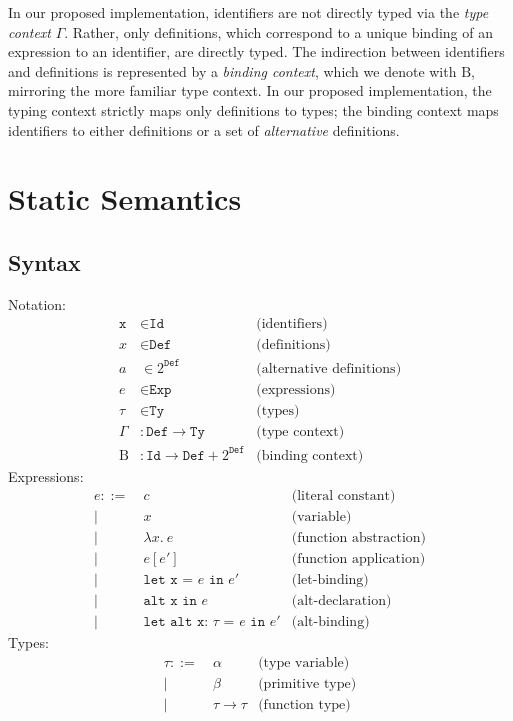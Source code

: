 \documentclass{article}
\renewcommand{\=}{\triangleq}
\begin{document}
In our proposed implementation, identifiers are not directly typed
via the \emph{type context} $\Gamma$.
Rather, only definitions, which correspond to a unique binding of an expression
to an identifier, are directly typed.
The indirection between identifiers and definitions is represented by a
\emph{binding context}, which we denote with $\text{B}$,
mirroring the more familiar type context.
In our proposed implementation, the typing context strictly maps only
definitions to types;
the binding context maps identifiers to either definitions or
a set of \emph{alternative} definitions.

\section{Static Semantics}

\subsection{Syntax}

Notation:
\begin{align*}
  \texttt{x} &\in \texttt{Id} & \text{(identifiers)} \\
  x &\in \texttt{Def} & \text{(definitions)} \\
  a &\in 2^{\texttt{Def}} & \text{(alternative definitions)} \\
  e &\in \texttt{Exp} & \text{(expressions)} \\
  \tau &\in \texttt{Ty} & \text{(types)} \\
  \Gamma &: \texttt{Def} \to \texttt{Ty} & \text{(type context)} \\
  \text{B} &: \texttt{Id} \to \texttt{Def} + 2^{\texttt{Def}} & \text{(binding context)}
\end{align*}
Expressions:
\begin{align*}
  e ::=
   ~& c & \text{(literal constant)} \\
  |~& x & \text{(variable)} \\
  |~& \lambda x .~e & \text{(function abstraction)} \\
  |~& e[e'] & \text{(function application)} \\
  |~& \texttt{let x = $e$ in $e'$} & \text{(let-binding)} \\
  |~& \texttt{alt x in $e$} & \text{(alt-declaration)} \\
  |~& \texttt{let alt x: $\tau$ = $e$ in $e'$} & \text{(alt-binding)}
\end{align*}
Types:
\begin{align*}
  \tau ::=
   ~& \alpha & \text{(type variable)} \\
  |~& \beta & \text{(primitive type)} \\
  |~& \tau \to \tau & \text{(function type)}
\end{align*}
\end{document}

